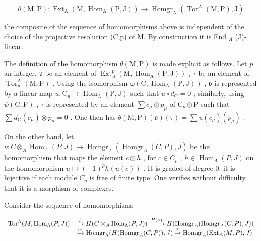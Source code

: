 \[
\theta (\mathrm{M}, \mathrm{P}): \operatorname{Ext} _ {\mathrm{A}} (\mathrm{M}, \operatorname{Hom} _ {\mathrm{A}} (\mathrm{P}, \mathrm{J})) \longrightarrow \operatorname{Homgr} _ {\mathrm{A}} \left(\operatorname{Tor} ^ {\mathrm{A}} (\mathrm{M}, \mathrm{P}), \mathrm{J}\right)
\]

the composite of the sequence of homomorphisms above is independent of the choice of the projective resolution (C,p) of M. By construction it is End \(_{A}\) (J)-linear.

The definition of the homomorphism \(\theta(\mathrm{M},\mathrm{P})\) is made explicit as follows. Let \(p\) an integer, \(\mathfrak{v}\) be an element of \(\operatorname{Ext}_{\Lambda}^{p}(\mathrm{M},\operatorname{Hom}_{\mathrm{A}}(\mathrm{P},\mathrm{J}))\) , \(\tau\) be an element of \(\operatorname{Tor}_{p}^{\mathrm{A}}(\mathrm{M},\mathrm{P})\) . Using the isomorphism \(\varphi(\mathrm{C},\operatorname{Hom}_{\mathrm{A}}(\mathrm{P},\mathrm{J}))\) , \(\mathfrak{v}\) is represented by a linear map \(u:\mathrm{C}_{p}\to\operatorname{Hom}_{\mathrm{A}}(\mathrm{P},\mathrm{J})\) such that \(u\circ d_{\mathrm{C}}=0\) ; similarly, using \(\psi(\mathrm{C},\mathrm{P})\) , \(\tau\) is represented by an element \(\sum c_{\mu}\otimes p_{\mu}\) of \(\mathrm{C}_{p}\otimes\mathrm{P}\) such that \(\sum d_{\mathrm{C}}(c_{\mu})\otimes p_{\mu}=0\) . One then has \(\theta(\mathrm{M},\mathrm{P})(\mathfrak{v})(\tau)=\sum u(c_{\mu})(p_{\mu})\) .

On the other hand, let \(\nu : C \otimes_A \operatorname{Hom}_A(P, J) \longrightarrow \operatorname{Homgr}_A(\operatorname{Homgr}_A(C, P), J)\) be the homomorphism that maps the element \(c \otimes h\) , for \(c \in C_p\) , \(h \in \operatorname{Hom}_A(P, J)\) on the homomorphism \(u \mapsto (-1)^p h(u(c))\) . It is graded of degree 0; it is bijective if each module \(C_p\) is free of finite type. One verifies without difficulty that it is a morphism of complexes.

Consider the sequence of homomorphisms

\[
\begin{array}{r l} \operatorname{Tor} ^ {\Lambda} (M, \operatorname{Hom} _ {\Lambda} (P, J)) & \xrightarrow {\psi} H (C \otimes_ {A} \operatorname{Hom} _ {\Lambda} (P, J)) \xrightarrow {H (\nu)} H (\operatorname{Homgr} _ {A} (\operatorname{Homgr} _ {A} (C, P), J)) \\ & \xrightarrow {w} \operatorname{Homgr} _ {\Lambda} (H (\operatorname{Homgr} _ {A} (C, P)), J) \xrightarrow {t} \operatorname{Homgr} _ {A} (\operatorname{Ext} _ {A} (M, P), J) \end{array}
\]

